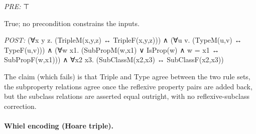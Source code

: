 \documentclass[10pt]{article}
\begin{document}
\textit{PRE:} ⊤\par True; no precondition constrains the inputs.

\textit{POST:} (∀x y z. (TripleM(x,y,z) ↔ TripleF(x,y,z))) ∧ (∀u v. (TypeM(u,v) ↔ TypeF(u,v))) ∧ (∀w x1. (SubPropM(w,x1) ∨ IsProp(w) ∧ w = x1 ↔ SubPropF(w,x1))) ∧ ∀x2 x3. (SubClassM(x2,x3) ↔ SubClassF(x2,x3))\par The claim (which fails) is that Triple and Type agree between the two rule sets, the subproperty relations agree once the reflexive property pairs are added back, but the subclass relations are asserted equal outright, with no reflexive-subclass correction.

\paragraph{Whiel encoding (Hoare triple).}
\end{document}
